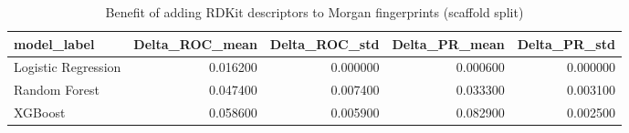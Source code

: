 \begin{table}
\caption{Benefit of adding RDKit descriptors to Morgan fingerprints (scaffold split)}
\label{tab:descriptor_benefit}
\begin{tabular}{lrrrr}
\toprule
model_label & Delta_ROC_mean & Delta_ROC_std & Delta_PR_mean & Delta_PR_std \\
\midrule
Logistic Regression & 0.016200 & 0.000000 & 0.000600 & 0.000000 \\
Random Forest & 0.047400 & 0.007400 & 0.033300 & 0.003100 \\
XGBoost & 0.058600 & 0.005900 & 0.082900 & 0.002500 \\
\bottomrule
\end{tabular}
\end{table}
